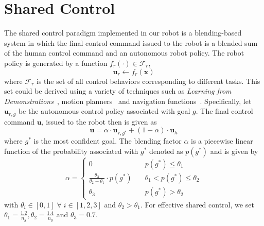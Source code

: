 \section{Shared Control}\label{sec:shared-control}
The shared control paradigm implemented in our robot is a blending-based system in  which the final control command issued to the robot is a blended sum of the human control command and an autonomous robot policy.
The robot policy is generated by a function $f_{r}(\cdot) \in \mathcal{F}_{r}$, 
\begin{equation*}
\boldsymbol{u}_r \leftarrow f_{r}(\boldsymbol{x})
\end{equation*}
where $\mathcal{F}_{r}$ is the set of all control behaviors corresponding to different tasks. This set could be derived using a variety of techniques such as \textit{Learning from Demonstrations}~\cite{argall2009survey, schaal1997learning, khansari2011learning, calinon2012statistical}, motion planners~\cite{hsu2002randomized,ratliff2009chomp} and navigation functions~\cite{rimon1992exact,tanner2003nonholonomic}. Specifically, let $\boldsymbol{u}_{r,g}$ be the autonomous control policy associated with goal $g$. The final control command $\boldsymbol{u}$, issued to the robot then is given as 
\begin{equation*}
\boldsymbol{u} = \alpha\cdot \boldsymbol{u}_{r,g^*} + (1 - \alpha)\cdot \boldsymbol{u}_h
\end{equation*}
where $g^*$ is the most confident goal. The blending factor $\alpha$ is a piecewise linear function of the probability associated with $g^*$ denoted as $p(g^*)$ and is given by
$$
\alpha = \left\{
\begin{array}{ll}
0 & \quad p(g^*) \leq \theta_1 \\
\frac{\theta_3}{\theta_2 - \theta_1}\cdot p(g^*) &  \quad \theta_1 < p(g^*) \leq \theta_2  \\
\theta_3 & \quad p(g^*) > \theta_2 	
\end{array}
\right.
$$
with $\theta_i \in [0, 1] \;\forall\; i \in [1,2,3]$ and $ \theta_2 > \theta_1$. 
For effective shared control, we set $\theta_1 = \frac{1.2}{n_g}, \theta_2 = \frac{1.4}{n_g}$ and $ \theta_3 = 0.7$.

